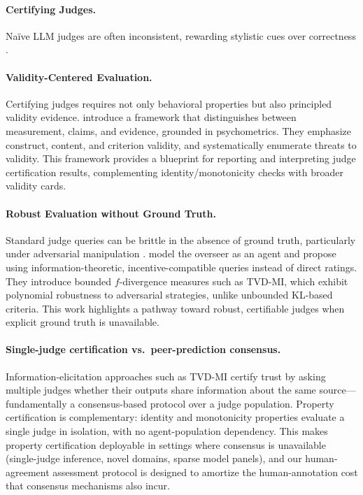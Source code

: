 \documentclass{article}
\begin{document}
\paragraph{Certifying Judges.}
Naïve LLM judges are often inconsistent, rewarding stylistic cues over correctness \citep{Kocmi2024HumanVsLLM,Li2024TrustLLMJudgments}.

\paragraph{Validity-Centered Evaluation.}
Certifying judges requires not only behavioral properties but also principled validity evidence. \citet{salaudeen2025measurement} introduce a framework that distinguishes between measurement, claims, and evidence, grounded in psychometrics. They emphasize construct, content, and criterion validity, and systematically enumerate threats to validity. This framework provides a blueprint for reporting and interpreting judge certification results, complementing identity/monotonicity checks with broader validity cards.

\paragraph{Robust Evaluation without Ground Truth.}
Standard judge queries can be brittle in the absence of ground truth, particularly under adversarial manipulation \citep{Zhuo2024ICEScore,TongZhang2024CodeJudge}. \citet{robertson2025stepbystep} model the overseer as an agent and propose using information-theoretic, incentive-compatible queries instead of direct ratings. They introduce bounded $f$-divergence measures such as TVD-MI, which exhibit polynomial robustness to adversarial strategies, unlike unbounded KL-based criteria. This work highlights a pathway toward robust, certifiable judges when explicit ground truth is unavailable.

\paragraph{Single-judge certification vs.\ peer-prediction consensus.}
Information-elicitation approaches such as TVD-MI \citep{robertson2025stepbystep} certify trust by asking multiple judges whether their outputs share information about the same source---fundamentally a consensus-based protocol over a judge population.
Property certification is complementary: identity and monotonicity properties evaluate a single judge in isolation, with no agent-population dependency.
This makes property certification deployable in settings where consensus is unavailable (single-judge inference, novel domains, sparse model panels), and our human-agreement assessment protocol is designed to amortize the human-annotation cost that consensus mechanisms also incur.
\end{document}
